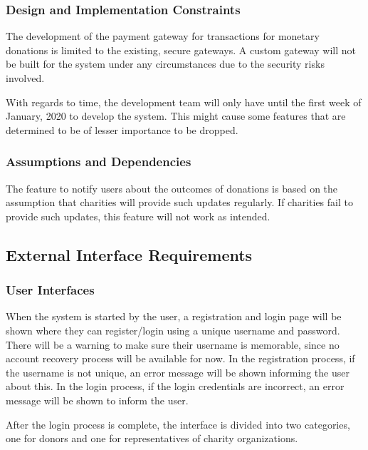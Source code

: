 \documentclass{scrreprt}
\begin{document}
            \subsubsection{Design and Implementation Constraints}
    
                The development of the payment gateway for transactions for monetary donations is limited to the existing, secure gateways. A custom gateway will not be built for the system under any circumstances due to the security risks involved.\par
    
                With regards to time, the development team will only have until the first week of January, 2020 to develop the system. This might cause some features that are determined to be of lesser importance to be dropped.
    
            \subsubsection{Assumptions and Dependencies}
    
                The feature to notify users about the outcomes of donations is based on the assumption that charities will provide such updates regularly. If charities fail to provide such updates, this feature will not work as intended.\par
    
        \subsection{External Interface Requirements}
    
            \subsubsection{User Interfaces}
    
                When the system is started by the user, a registration and login page will be shown where they can register/login using a unique username and password. There will be a warning to make sure their username is memorable, since no account recovery process will be available for now. In the registration process, if the username is not unique, an error message will be shown informing the user about this. In the login process, if the login credentials are incorrect, an error message will be shown to inform the user.\par
    
                After the login process is complete, the interface is divided into two categories, one for donors and one for representatives of charity organizations.
    
\end{document}
